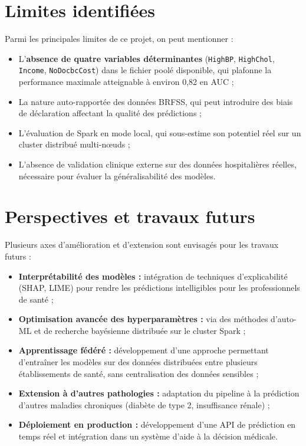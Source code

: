 \documentclass[12pt,a4paper]{report}
\begin{document}
\section*{Limites identifiées}

Parmi les principales limites de ce projet, on peut mentionner :

\begin{itemize}
  \item L'\textbf{absence de quatre variables déterminantes} (\texttt{HighBP},
    \texttt{HighChol}, \texttt{Income}, \texttt{NoDocbcCost}) dans le fichier poolé
    disponible, qui plafonne la performance maximale atteignable à environ 0,82 en AUC ;
  \item La nature auto-rapportée des données \acs{BRFSS}, qui peut introduire
    des biais de déclaration affectant la qualité des prédictions ;
  \item L'évaluation de Spark en mode local, qui sous-estime son potentiel réel sur
    un cluster distribué multi-nœuds ;
  \item L'absence de validation clinique externe sur des données hospitalières
    réelles, nécessaire pour évaluer la généralisabilité des modèles.
\end{itemize}

\section*{Perspectives et travaux futurs}

Plusieurs axes d'amélioration et d'extension sont envisagés pour les travaux
futurs :

\begin{itemize}
  \item \textbf{Interprétabilité des modèles :} intégration de techniques
    d'explicabilité (SHAP, LIME) pour rendre les prédictions intelligibles pour
    les professionnels de santé ;
  \item \textbf{Optimisation avancée des hyperparamètres :} via des méthodes
    d'auto-ML et de recherche bayésienne distribuée sur le cluster Spark ;
  \item \textbf{Apprentissage fédéré :} développement d'une approche permettant
    d'entraîner les modèles sur des données distribuées entre plusieurs
    établissements de santé, sans centralisation des données sensibles ;
  \item \textbf{Extension à d'autres pathologies :} adaptation du pipeline à la
    prédiction d'autres maladies chroniques (diabète de type 2, insuffisance
    rénale) ;
  \item \textbf{Déploiement en production :} développement d'une \acs{API} de
    prédiction en temps réel et intégration dans un système d'aide à la décision
    médicale.
\end{itemize}
\end{document}

